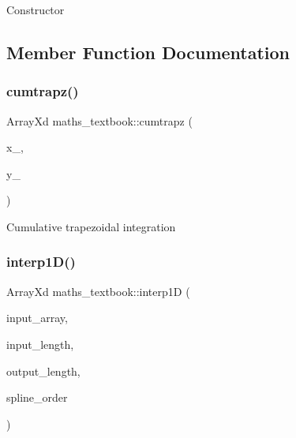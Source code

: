 Constructor 

\subsection{Member Function Documentation}
\mbox{\label{classmaths__textbook_ae893700d202ab9a84e33974f9ca42da3}} 
\subsubsection{\texorpdfstring{cumtrapz()}{cumtrapz()}}
{\footnotesize\ttfamily Array\+Xd maths\+\_\+textbook\+::cumtrapz (\begin{DoxyParamCaption}\item[{Array\+Xd}]{x\+\_\+,  }\item[{Array\+Xd}]{y\+\_\+ }\end{DoxyParamCaption})}

Cumulative trapezoidal integration \mbox{\label{classmaths__textbook_a803caea252953788b96a898a3bab9bd0}} 
\subsubsection{\texorpdfstring{interp1D()}{interp1D()}\hspace{0.1cm}{\footnotesize\ttfamily [1/2]}}
{\footnotesize\ttfamily Array\+Xd maths\+\_\+textbook\+::interp1D (\begin{DoxyParamCaption}\item[{Array\+Xd}]{input\+\_\+array,  }\item[{int}]{input\+\_\+length,  }\item[{int}]{output\+\_\+length,  }\item[{int}]{spline\+\_\+order }\end{DoxyParamCaption})}

\mbox{\label{classmaths__textbook_ac4789e1e67a597303faab6cc5fa889ec}} 
